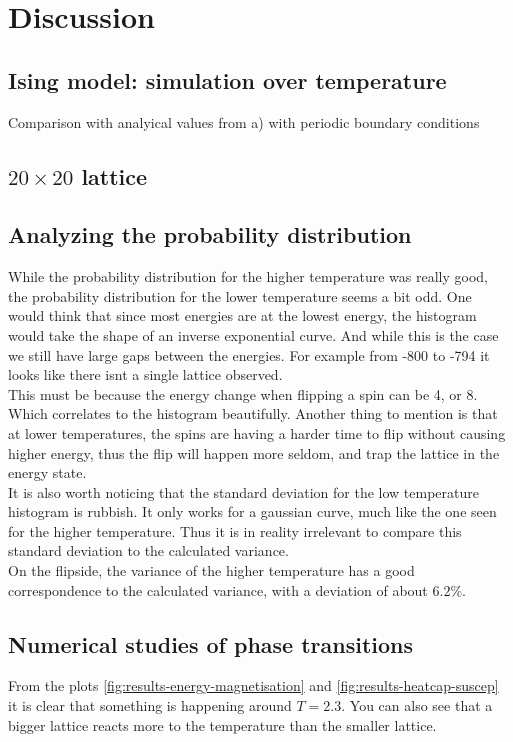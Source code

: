 \documentclass[../main.tex]{subfiles}
\begin{document}
\section{Discussion}

\subsection{Ising model: simulation over temperature}
Comparison with analyical values from a) with periodic boundary conditions




\subsection{$20 \times 20$ lattice}




\subsection{Analyzing the probability distribution}
While the probability distribution for the higher temperature was really good, the probability distribution for the lower temperature seems a bit odd. One would think that since most energies are at the lowest energy, the histogram would take the shape of an inverse exponential curve. And while this is the case we still have large gaps between the energies. For example from -800 to -794 it looks like there isnt a single lattice observed. \\
This must be because the energy change when flipping a spin can be 4, or 8. Which correlates to the histogram beautifully. Another thing to mention is that at lower temperatures, the spins are having a harder time to flip without causing higher energy, thus the flip will happen more seldom, and trap the lattice in the energy state.\\
It is also worth noticing that the standard deviation for the low temperature histogram is rubbish. It only works for a gaussian curve, much like the one seen for the higher temperature. Thus it is in reality irrelevant to compare this standard deviation to the calculated variance.\\
On the flipside, the variance of the higher temperature has a good correspondence to the calculated variance, with a deviation of about $6.2\%$.


\subsection{Numerical studies of phase transitions}
From the plots \ref{fig:results-energy-magnetisation} and \ref{fig:results-heatcap-suscep} it is clear that something is happening around $T = 2.3$. You can also see that a bigger lattice reacts more to the temperature than the smaller lattice.\\
\end{document}
